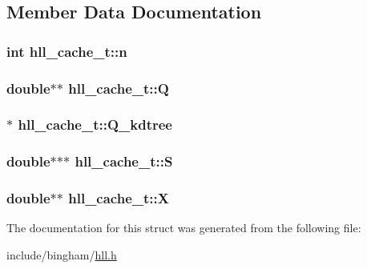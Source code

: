 \subsection{Member Data Documentation}
\hypertarget{structhll__cache__t_a90b9630049c7e84854bb5a860c333986}{
\subsubsection[{n}]{\setlength{\rightskip}{0pt plus 5cm}int {\bf hll\_\-cache\_\-t::n}}}
\label{structhll__cache__t_a90b9630049c7e84854bb5a860c333986}
\hypertarget{structhll__cache__t_af4938f0607cf4eb7e08fbdb7a65e28d0}{
\subsubsection[{Q}]{\setlength{\rightskip}{0pt plus 5cm}double$\ast$$\ast$ {\bf hll\_\-cache\_\-t::Q}}}
\label{structhll__cache__t_af4938f0607cf4eb7e08fbdb7a65e28d0}
\hypertarget{structhll__cache__t_a08ae98a19cb63f02b1afa97396cb3d88}{
\subsubsection[{Q\_\-kdtree}]{$\ast$ {\bf hll\_\-cache\_\-t::Q\_\-kdtree}}}
\label{structhll__cache__t_a08ae98a19cb63f02b1afa97396cb3d88}
\hypertarget{structhll__cache__t_a864537e23837ff93646de7197de6373a}{
\subsubsection[{S}]{\setlength{\rightskip}{0pt plus 5cm}double$\ast$$\ast$$\ast$ {\bf hll\_\-cache\_\-t::S}}}
\label{structhll__cache__t_a864537e23837ff93646de7197de6373a}
\hypertarget{structhll__cache__t_aa49657b2cb0646e475393f35b22d6ab1}{
\subsubsection[{X}]{\setlength{\rightskip}{0pt plus 5cm}double$\ast$$\ast$ {\bf hll\_\-cache\_\-t::X}}}
\label{structhll__cache__t_aa49657b2cb0646e475393f35b22d6ab1}


The documentation for this struct was generated from the following file:\begin{DoxyCompactItemize}
\item 
include/bingham/\hyperlink{hll_8h}{hll.h}\end{DoxyCompactItemize}
